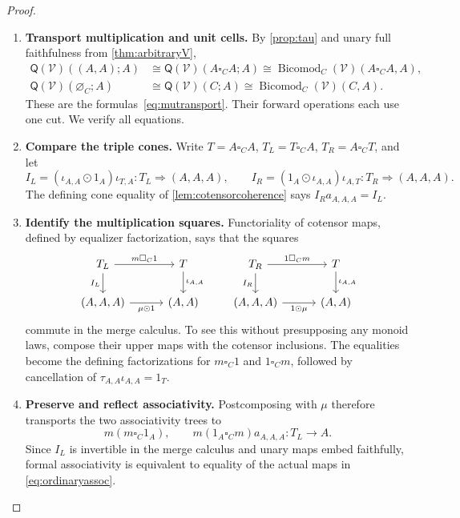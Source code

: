 \documentclass[11pt,reqno]{amsart}
\theoremstyle{plain}
\theoremstyle{definition}
\theoremstyle{remark}
\numberwithin{equation}{section}
\newcommand{\V}{\mathcal V}
\newcommand{\Q}{\mathsf Q}
\newcommand{\cell}{\mathrel{\Longrightarrow}}
\newcommand{\emp}[1]{\varnothing_{#1}}
\newcommand{\Bicomod}{\operatorname{Bicomod}}
\newcommand{\wh}{\mathbin{\odot}}
\begin{document}
\begin{proof}\leavevmode
\begin{enumerate}
\item \textbf{Transport multiplication and unit cells.} By \cref{prop:tau} and unary full faithfulness from
\cref{thm:arbitraryV},
\begin{align*}
 \Q(\V)((A,A);A)&\cong
 \Q(\V)(A\square_C A;A)
 \cong\Bicomod_C(\V)(A\square_C A,A),\\
 \Q(\V)(\emp C;A)&\cong
 \Q(\V)(C;A)
 \cong\Bicomod_C(\V)(C,A).
\end{align*}
These are the formulas~\eqref{eq:mutransport}. Their forward
operations each use one cut. We verify all equations.

\item \textbf{Compare the triple cones.} Write $T=A\square_C A$, $T_L=T\square_C A$, $T_R=A\square_C T$,
and let
\[
 I_L=(\iota_{A,A}\wh1_A)\iota_{T,A}:T_L\cell(A,A,A),\qquad
 I_R=(1_A\wh\iota_{A,A})\iota_{A,T}:T_R\cell(A,A,A).
\]
The defining cone equality of \cref{lem:cotensorcoherence} says
$I_Ra_{A,A,A}=I_L$.

\item \textbf{Identify the multiplication squares.} Functoriality of cotensor maps, defined by
equalizer factorization, says that the squares
\[
\begin{tikzcd}[column sep=3em]
 T_L \arrow[r,"m\square_C1"] \arrow[d,"I_L"'] &
 T \arrow[d,"\iota_{A,A}"]\\
 (A,A,A) \arrow[r,"\mu\wh1"'] &(A,A)
\end{tikzcd}
\qquad
\begin{tikzcd}[column sep=3em]
 T_R \arrow[r,"1\square_Cm"] \arrow[d,"I_R"'] &
 T \arrow[d,"\iota_{A,A}"]\\
 (A,A,A) \arrow[r,"1\wh\mu"'] &(A,A)
\end{tikzcd}
\]
commute in the merge calculus. To see this without presupposing any
monoid laws, compose their upper maps with the cotensor inclusions.
The equalities become the defining factorizations for
$m\square_C1$ and $1\square_Cm$, followed by cancellation of
$\tau_{A,A}\iota_{A,A}=1_T$.

\item \textbf{Preserve and reflect associativity.} Postcomposing with $\mu$ therefore transports the two associativity
trees to
\begin{equation}\label{eq:ordinaryassoc}
 m(m\square_C1_A),\qquad
 m(1_A\square_Cm)a_{A,A,A}:T_L\longrightarrow A.
\end{equation}
Since $I_L$ is invertible in the merge calculus and unary maps embed
faithfully, formal associativity is equivalent to equality of the
actual maps in \cref{eq:ordinaryassoc}.


\end{enumerate}
\end{proof}
\end{document}
